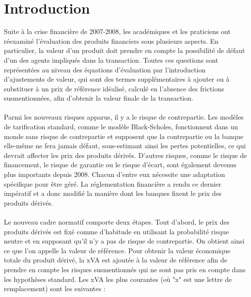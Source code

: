 \documentclass[a4paper,12pt]{report}
\numberwithin{equation}{section}
\theoremstyle{definition}
\numberwithin{equation}{section}
\begin{document}
\tableofcontents
\endgroup
\newpage
\begingroup
\hypersetup{linkcolor=midnightblue}
\listoffigures
\endgroup

\newpage

\begingroup
\hypersetup{linkcolor=midnightblue}
 \listoftables
\endgroup
 
\newpage
\chapter{Introduction}
Suite à la crise financière de 2007-2008, les académiques et les praticiens ont réexaminé l'évaluation des produits financiers sous plusieurs aspects. En particulier, la valeur d'un produit doit prendre en compte la possibilité de défaut d'un des agents impliqués dans la transaction. Toutes ces questions sont représentées au niveau des équations d'évaluation par l'introduction d'ajustements de valeur, qui sont des termes supplémentaires à ajouter ou à substituer à un prix de référence idéalisé, calculé en l'absence des frictions susmentionnées, afin d'obtenir la valeur finale de la transaction.\\\\
Parmi les nouveaux risques apparus, il y a le risque de contrepartie. Les modèles de tarification standard, comme le modèle Black-Scholes, fonctionnent dans un monde sans risque de contrepartie et supposent que la contrepartie ou la banque elle-même ne fera jamais défaut, sous-estimant ainsi les pertes potentielles, ce qui devrait affecter les prix des produits dérivés. D'autres risques, comme le risque de financement, le risque de garantie ou le risque d'écart, sont également devenus plus importants depuis 2008. Chacun d'entre eux nécessite une adaptation spécifique pour être géré. La réglementation financière a rendu ce dernier impératif et a donc modifié la manière dont les banques fixent le prix des produits dérivés.\\\\
Le nouveau cadre normatif comporte deux étapes. Tout d'abord, le prix des produits dérivés est fixé comme d'habitude en utilisant la probabilité risque neutre et en supposant qu'il n'y a pas de risque de contrepartie. On obtient ainsi ce que l'on appelle la valeur de référence. Pour obtenir la valeur économique totale du produit dérivé, la xVA est ajoutée à la valeur de référence afin de prendre en compte les risques susmentionnés qui ne sont pas pris en compte dans les hypothèses standard. Les xVA les plus courantes (où "x" est une lettre de remplacement) sont les suivantes :
\vspace*{0.3cm}
\end{document}
